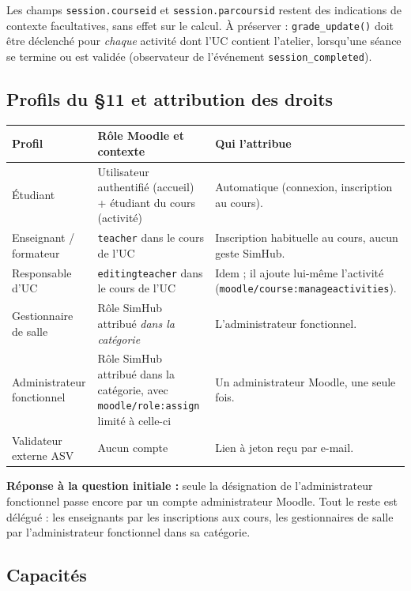 \documentclass[11pt,a4paper]{article}
\newcommand{\code}[1]{\texttt{\small #1}}
\begin{document}
\noindent Les champs \code{session.courseid} et \code{session.parcoursid} restent des
indications de contexte facultatives, sans effet sur le calcul. À préserver :
\code{grade\_update()} doit être déclenché pour \emph{chaque} activité dont l'UC contient
l'atelier, lorsqu'une séance se termine ou est validée (observateur de l'événement
\code{session\_completed}).

\subsection{Profils du §11 et attribution des droits}

\begin{center}
\begin{tabularx}{\textwidth}{>{\raggedright}p{3.3cm}>{\raggedright}p{4.5cm}X}
\toprule
\textbf{Profil} & \textbf{Rôle Moodle et contexte} & \textbf{Qui l'attribue} \\
\midrule
Étudiant & Utilisateur authentifié (accueil) + étudiant du cours (activité) &
Automatique (connexion, inscription au cours). \\
Enseignant / formateur & \code{teacher} dans le cours de l'UC & Inscription habituelle au
cours, aucun geste SimHub. \\
Responsable d'UC & \code{editingteacher} dans le cours de l'UC & Idem ; il ajoute
lui-même l'activité (\code{moodle/course:manageactivities}). \\
Gestionnaire de salle & Rôle SimHub attribué \emph{dans la catégorie} & L'administrateur
fonctionnel. \\
Administrateur fonctionnel & Rôle SimHub attribué dans la catégorie, avec
\code{moodle/role:assign} limité à celle-ci & Un administrateur Moodle, une seule fois. \\
Validateur externe ASV & Aucun compte & Lien à jeton reçu par e-mail. \\
\bottomrule
\end{tabularx}
\end{center}

\noindent\textbf{Réponse à la question initiale :} seule la désignation de
l'administrateur fonctionnel passe encore par un compte administrateur
Moodle. Tout le reste est délégué : les enseignants par les inscriptions aux cours, les
gestionnaires de salle par l'administrateur fonctionnel dans sa catégorie.

\subsection{Capacités}
\end{document}
